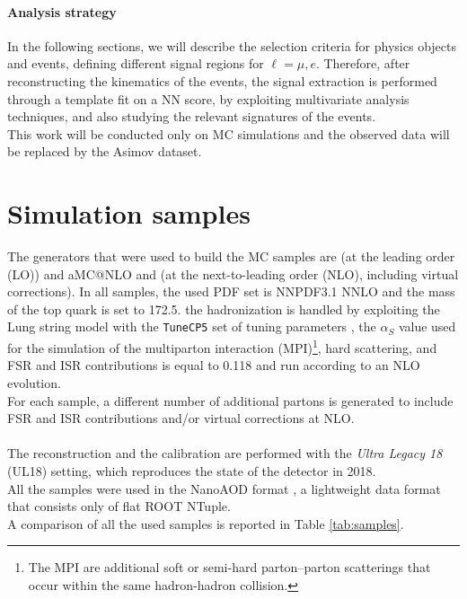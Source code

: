 \paragraph*{Analysis strategy}
In the following sections, we will describe the selection criteria for physics objects and events, defining different signal regions for $\ell=\mu,e$.
Therefore, after reconstructing the kinematics of the events, the signal extraction is performed through a template fit on a NN score, by exploiting multivariate analysis techniques, and also studying the relevant signatures of the events.\\
This work will be conducted only on MC simulations and the observed data will be replaced by the Asimov dataset.



\section{Simulation samples}
The generators that were used to build the MC samples are  (at the leading order (LO)) and aMC@NLO and  (at the next-to-leading order (NLO), including virtual corrections). In all samples, the used PDF set is NNPDF3.1 NNLO and the mass of the top quark is set to 172.5\GeV. the hadronization is handled by  exploiting the Lung string model with the \texttt{TuneCP5} set of tuning parameters \ADDREF, \ie the $\alpha_S$ value used for the simulation of the multiparton interaction (MPI)\footnote{The MPI are additional soft or semi-hard parton–parton scatterings that occur within the same hadron-hadron collision.}, hard scattering, and FSR and ISR contributions is equal to 0.118 and run according to an NLO evolution. \\
For each sample, a different number of additional partons is generated to include FSR and ISR contributions and/or virtual corrections at NLO.
\\
\\
The reconstruction and the calibration are performed with the \textit{Ultra Legacy 18} (UL18) setting, which reproduces the state of the detector in 2018.\\
All the samples were used in the NanoAOD format \ADDREF, a lightweight data format that consists only of flat ROOT NTuple.
\\
A comparison of all the used samples is reported in Table \ref{tab:samples}.
